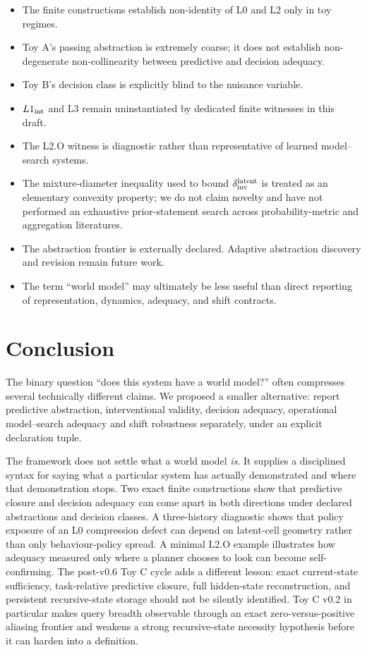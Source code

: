 \documentclass[10pt]{article}
\begin{document}
\begin{itemize}
    \item The finite constructions establish non-identity of L0 and L2 only in toy regimes.
    \item Toy A's passing abstraction is extremely coarse; it does not establish non-degenerate non-collinearity between predictive and decision adequacy.
    \item Toy B's decision class is explicitly blind to the nuisance variable.
    \item $L1_{\rm int}$ and L3 remain uninstantiated by dedicated finite witnesses in this draft.
    \item The L2.O witness is diagnostic rather than representative of learned model--search systems.
    \item The mixture-diameter inequality used to bound $\delta_{\rm inv}^{\rm latent}$ is treated as an elementary convexity property; we do not claim novelty and have not performed an exhaustive prior-statement search across probability-metric and aggregation literatures.
    \item The abstraction frontier is externally declared. Adaptive abstraction discovery and revision remain future work.
    \item The term ``world model'' may ultimately be less useful than direct reporting of representation, dynamics, adequacy, and shift contracts.
\end{itemize}

\section{Conclusion}

The binary question ``does this system have a world model?'' often compresses several technically different claims. We proposed a smaller alternative: report predictive abstraction, interventional validity, decision adequacy, operational model--search adequacy and shift robustness separately, under an explicit declaration tuple.

The framework does not settle what a world model \emph{is}. It supplies a disciplined syntax for saying what a particular system has actually demonstrated and where that demonstration stops. Two exact finite constructions show that predictive closure and decision adequacy can come apart in both directions under declared abstractions and decision classes. A three-history diagnostic shows that policy exposure of an L0 compression defect can depend on latent-cell geometry rather than only behaviour-policy spread. A minimal L2.O example illustrates how adequacy measured only where a planner chooses to look can become self-confirming. The post-v0.6 Toy C cycle adds a different lesson: exact current-state sufficiency, task-relative predictive closure, full hidden-state reconstruction, and persistent recursive-state storage should not be silently identified. Toy C v0.2 in particular makes query breadth observable through an exact zero-versus-positive aliasing frontier and weakens a strong recursive-state necessity hypothesis before it can harden into a definition.
\end{document}
